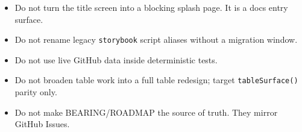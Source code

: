 \begin{itemize}
\tightlist
\item
  Do not turn the title screen into a blocking splash page. It is a docs entry surface.
\item
  Do not rename legacy \texttt{s\allowbreak{}t\allowbreak{}o\allowbreak{}r\allowbreak{}y\allowbreak{}b\allowbreak{}o\allowbreak{}o\allowbreak{}k} script aliases without a migration window.
\item
  Do not use live GitHub data inside deterministic tests.
\item
  Do not broaden table work into a full table redesign; target \texttt{t\allowbreak{}a\allowbreak{}b\allowbreak{}l\allowbreak{}e\allowbreak{}S\allowbreak{}u\allowbreak{}r\allowbreak{}f\allowbreak{}a\allowbreak{}c\allowbreak{}e\allowbreak{}(\allowbreak{})} parity only.
\item
  Do not make BEARING/ROADMAP the source of truth. They mirror GitHub Issues.
\end{itemize}

